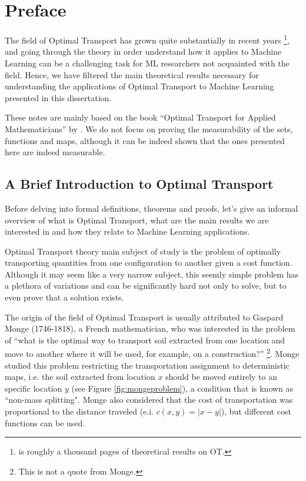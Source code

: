 \newpage
\chapter*{Preface}

The field of Optimal Transport has grown quite substantially in recent years
\footnote{\citet{villani2008optimal} is roughly a thousand pages of theoretical results on OT.},
and going through the theory in order understand how it applies to Machine Learning can be a challenging task for
ML researchers not acquainted with the field.
Hence, we have filtered the main theoretical
results necessary for understanding the applications of Optimal Transport to Machine Learning
presented in this dissertation.

These notes are mainly based on the book
``Optimal Transport for Applied Mathematicians'' by
\citet{santambrogio2015optimal}. We do not focus
on proving the measurability of the sets, functions and maps, although it can be indeed shown
that the ones presented here are indeed measurable.

\section*{A Brief Introduction to Optimal Transport}

Before delving into formal definitions, theorems and proofs, let's give an informal overview of what is
Optimal Transport, what are the main results we are interested in and how they relate to Machine Learning applications.

Optimal Transport theory main subject of study is the problem of optimally transporting
quantities from one configuration to another given a cost function. Although it may seem like a very narrow subject,
this seemly simple problem has a plethora of variations and can be significantly hard not only to solve,
but to even prove that a solution exists.

The origin of the field of Optimal Transport is usually
attributed to Gaspard Monge (1746-1818), a French mathematician, who was interested in the problem
of ``what is the optimal way to transport soil extracted from one location and move to another where it will be used,
for example, on a construction?''
\footnote{This is not a quote from Monge.}\citep{villani2008optimal}.
Monge studied this problem restricting the transportation assignment to deterministic maps, i.e. the soil
extracted from location $x$ should be moved entirely to an specific location $y$ (see Figure \ref{fig:mongeproblem}),
a condition that is known as ``non-mass splitting". Monge also considered that the cost of transportation
was proportional to the distance traveled (e.i. $c(x,y) = |x-y|$), but different cost functions can be used.

